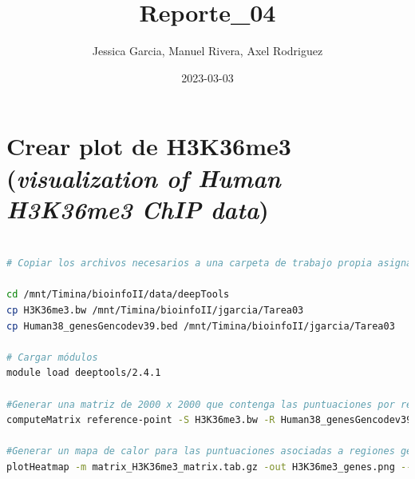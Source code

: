 \documentclass[
]{article}
\title{Reporte\_04}
\author{Jessica Garcia, Manuel Rivera, Axel Rodriguez}
\date{2023-03-03}
\begin{document}
\maketitle

{
\setcounter{tocdepth}{3}
\tableofcontents
}
\hypertarget{crear-plot-de-h3k36me3-visualization-of-human-h3k36me3-chip-data}{%
\section{\texorpdfstring{Crear plot de H3K36me3 (\emph{visualization of
Human H3K36me3 ChIP
data})}{Crear plot de H3K36me3 (visualization of Human H3K36me3 ChIP data)}}\label{crear-plot-de-h3k36me3-visualization-of-human-h3k36me3-chip-data}}

\begin{lstlisting}[language=bash]

# Copiar los archivos necesarios a una carpeta de trabajo propia asignada para esta tarea

cd /mnt/Timina/bioinfoII/data/deepTools
cp H3K36me3.bw /mnt/Timina/bioinfoII/jgarcia/Tarea03
cp Human38_genesGencodev39.bed /mnt/Timina/bioinfoII/jgarcia/Tarea03 

# Cargar módulos
module load deeptools/2.4.1

#Generar una matriz de 2000 x 2000 que contenga las puntuaciones por regiones del genoma y preparar un archivo intermedio para usarse con el comando plotHeatmap.
computeMatrix reference-point -S H3K36me3.bw -R Human38_genesGencodev39.bed --referencePoint center -a 2000 -b 2000 -out matrix_H3K36me3_matrix.tab.gz

#Generar un mapa de calor para las puntuaciones asociadas a regiones genómicas
plotHeatmap -m matrix_H3K36me3_matrix.tab.gz -out H3K36me3_genes.png --heatmapHeight 15 --refPointLabel gene.center --regionsLabel genes --plotTitle ' H3K36me3 signal'
\end{lstlisting}
\end{document}
